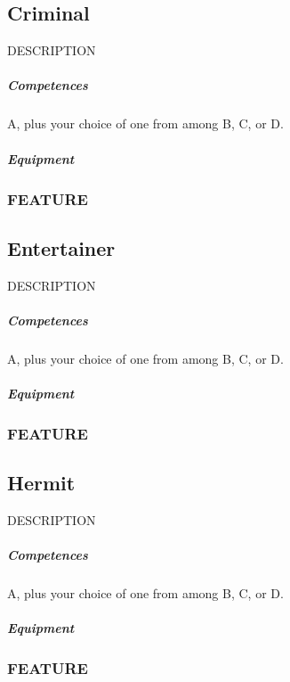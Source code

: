 \subsection*{Criminal} \label{ssec::criminal}
    DESCRIPTION
    \subparagraph{Competences} A, plus your choice of one from among B, C, or D.
    \subparagraph{Equipment}
    \subsubsection{FEATURE}

\subsection*{Entertainer} \label{ssec::entertainer}
    DESCRIPTION
    \subparagraph{Competences} A, plus your choice of one from among B, C, or D.
    \subparagraph{Equipment}
    \subsubsection{FEATURE}


\subsection*{Hermit} \label{ssec::hermit}
    DESCRIPTION
    \subparagraph{Competences} A, plus your choice of one from among B, C, or D.
    \subparagraph{Equipment}
    \subsubsection{FEATURE}

